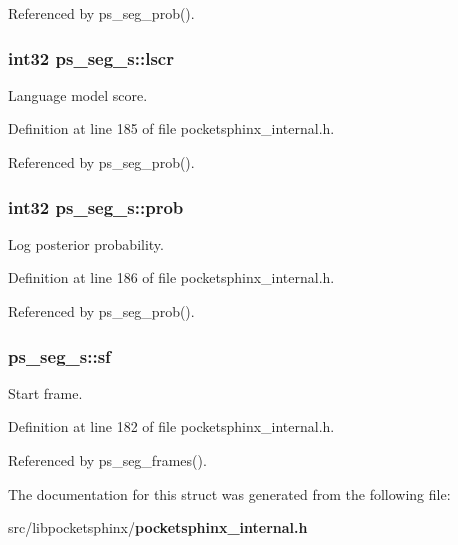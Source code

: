 Referenced by ps\+\_\+seg\+\_\+prob().

\subsubsection[{lscr}]{\setlength{\rightskip}{0pt plus 5cm}int32 ps\+\_\+seg\+\_\+s\+::lscr}\label{structps__seg__s_a69e605f422eeed1a9c67437e8ddd8b08}


Language model score. 



Definition at line 185 of file pocketsphinx\+\_\+internal.\+h.



Referenced by ps\+\_\+seg\+\_\+prob().

\subsubsection[{prob}]{\setlength{\rightskip}{0pt plus 5cm}int32 ps\+\_\+seg\+\_\+s\+::prob}\label{structps__seg__s_ae683244d90d0a5339930b47757778432}


Log posterior probability. 



Definition at line 186 of file pocketsphinx\+\_\+internal.\+h.



Referenced by ps\+\_\+seg\+\_\+prob().

\subsubsection[{sf}]{ ps\+\_\+seg\+\_\+s\+::sf}\label{structps__seg__s_a885a599726cd0efba573d106d016e6e2}


Start frame. 



Definition at line 182 of file pocketsphinx\+\_\+internal.\+h.



Referenced by ps\+\_\+seg\+\_\+frames().



The documentation for this struct was generated from the following file\+:\begin{DoxyCompactItemize}
\item 
src/libpocketsphinx/{\bf pocketsphinx\+\_\+internal.\+h}\end{DoxyCompactItemize}

